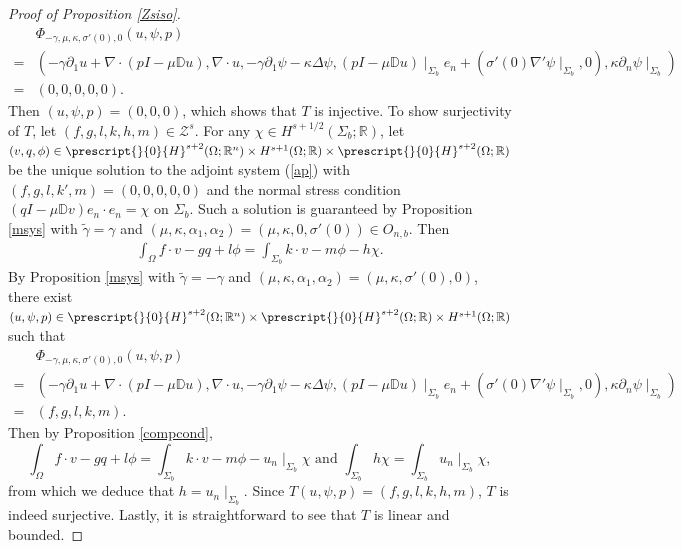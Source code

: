 \documentclass[11pt,letterpaper,reqno]{amsart}
\numberwithin{equation}{section}
\begin{document}
\begin{proof}[Proof of Proposition \ref{Zsiso}]
    \begin{align}
        &\Phi_{-\gamma,\mu,\kappa,\sigma'(0),0}(u,\psi,p) \nonumber\\
        =&(-\gamma\partial_{1}u+\nabla\cdot (pI-\mu\mathbb{D}u), \nabla \cdot u, -\gamma\partial_{1}\psi-\kappa\Delta\psi,(pI-\mu\mathbb{D}u)\mid_{\Sigma_{b}}e_{n}+(\sigma'(0)\nabla'\psi\mid_{\Sigma_{b}},0),\kappa\partial_{n}\psi \mid_{\Sigma_{b}}) \nonumber\\
        =&(0,0,0,0,0).
    \end{align}
    Then \((u,\psi,p)=(0,0,0)\), which shows that \(T\) is injective. To show surjectivity of \(T\), let \((f,g,l,k,h,m) \in \mathcal{Z}^{s}\). For any \(\chi \in H^{s+1/2}(\Sigma_{b};\mathbb{R})\), let \((v,q,\phi) \in \prescript{}{0}{H}^{s+2}(\Omega;\mathbb{R}^{n}) \times H^{s+1}(\Omega;\mathbb{R}) \times \prescript{}{0}{H}^{s+2}(\Omega;\mathbb{R})\) be the unique solution to the adjoint system (\ref{ap}) with \((f,g,l,k',m)=(0,0,0,0,0)\) and the normal stress condition \((qI-\mu\mathbb{D}v)e_{n} \cdot e_{n}=\chi\) on \(\Sigma_{b}\). Such a solution is guaranteed by Proposition \ref{msys} with \(\widetilde{\gamma}=\gamma\) and \((\mu,\kappa,\alpha_{1},\alpha_{2})=(\mu,\kappa,0,\sigma'(0)) \in O_{n,b}\). Then
    \begin{align}
        \int_{\Omega}f \cdot v -gq+l\phi=\int_{\Sigma_{b}}k \cdot v-m\phi-h\chi.
    \end{align}
    By Proposition \ref{msys} with \(\widetilde{\gamma}=-\gamma\) and \((\mu,\kappa,\alpha_{1},\alpha_{2})=(\mu,\kappa,\sigma'(0),0)\), there exist \((u,\psi,p) \in \prescript{}{0}{H}^{s+2}(\Omega;\mathbb{R}^{n}) \times \prescript{}{0}{H}^{s+2}(\Omega;\mathbb{R}) \times H^{s+1}(\Omega;\mathbb{R})\) such that
    \begin{align}
        &\Phi_{-\gamma,\mu,\kappa,\sigma'(0),0}(u,\psi,p) \nonumber\\
        =&(-\gamma\partial_{1}u+\nabla\cdot (pI-\mu\mathbb{D}u), \nabla \cdot u, -\gamma\partial_{1}\psi-\kappa\Delta\psi,(pI-\mu\mathbb{D}u)\mid_{\Sigma_{b}}e_{n}+(\sigma'(0)\nabla'\psi\mid_{\Sigma_{b}},0),\kappa\partial_{n}\psi \mid_{\Sigma_{b}}) \nonumber\\
        =&(f,g,l,k,m).
    \end{align}
    Then by Proposition \ref{compcond},
    \begin{equation}
        \int_{\Omega}f \cdot v -gq+l\phi=\int_{\Sigma_{b}}k \cdot v-m\phi-u_{n}\mid_{\Sigma_{b}}\chi \text{ and }\int_{\Sigma_{b}} h \chi=\int_{\Sigma_{b}}u_{n} \mid_{\Sigma_{b}}\chi,
    \end{equation}
    from which we deduce that \(h=u_{n} \mid_{\Sigma_{b}}\). Since \(T(u,\psi,p)=(f,g,l,k,h,m)\), \(T\) is indeed surjective. Lastly, it is straightforward to see that \(T\) is linear and bounded.
\end{proof}
\end{document}
